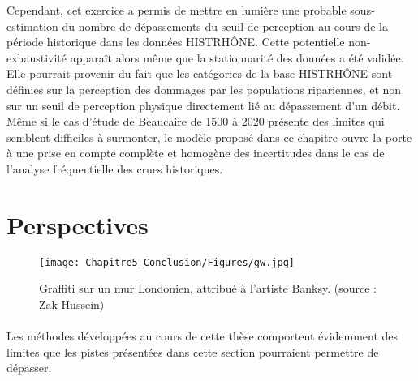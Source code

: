 Cependant, cet exercice a permis de mettre en lumière une probable sous-estimation du nombre de dépassements du seuil de perception au cours de la période historique dans les données HISTRHÔNE. Cette potentielle non-exhaustivité apparaît alors même que la stationnarité des données a été validée. Elle pourrait provenir du fait que les catégories de la base HISTRHÔNE sont définies sur la perception des dommages par les populations ripariennes, et non sur un seuil de perception physique directement lié au dépassement d'un débit. Même si le cas d'étude de Beaucaire de 1500 à 2020 présente des limites qui semblent difficiles à surmonter, le modèle proposé dans ce chapitre ouvre la porte à une prise en compte complète et homogène des incertitudes dans le cas de l'analyse fréquentielle des crues historiques. 

\newpage
	\section{Perspectives}
	
	\begin{figure}[h!]
	\centering
		\texttt{[image: Chapitre5\_Conclusion/Figures/gw.jpg]}
        \caption{Graffiti sur un mur Londonien, attribué à l'artiste Banksy. (source : Zak Hussein)}	
		\label{fig:gw}
	\end{figure}
		
	
	\paragraph{} Les méthodes développées au cours de cette thèse comportent évidemment des limites que les pistes présentées dans cette section pourraient permettre de dépasser. 
	
